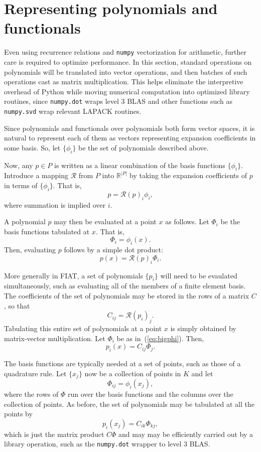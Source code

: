 \section{Representing polynomials and functionals}
Even using recurrence relations and \texttt{numpy} vectorization for
arithmetic, further care is required to optimize performance.  In this
section, standard
operations on polynomials will be translated into vector operations, and
then batches of such operations cast as matrix multiplication.  This
helps eliminate the interpretive overhead of Python while moving
numerical computation into  optimized library routines, since
\texttt{numpy.dot} wraps level 3 BLAS and other functions such as
\texttt{numpy.svd} wrap relevant LAPACK routines.

Since polynomials and
functionals over polynomials both form vector spaces, it is natural
to represent each of them as vectors representing expansion
coefficients in some basis.  So, let \( \{ \phi_i \} \) be the set of
polynomials described above.

Now, any \( p \in P \) is written as a linear combination of the basis
functions \( \{ \phi_i \} \).  Introduce a mapping \( \mathcal{R} \)
from \( P \) into \( \mathbb{R}^{|P|} \) by taking the expansion
coefficients of \( p \) in terms of \( \{ \phi_i \} \).  That is,
\[
p = \mathcal{R}(p)_i \phi_i,
\]
where summation is implied over \( i \).

A polynomial \( p \) may then be evaluated at a point \( x \) as
follows.  Let \( \Phi_i \) be the basis functions tabulated at \( x
\).  That is,
\begin{equation}
\label{eq:bigphi}
\Phi_i = \phi_i(x).
\end{equation}
Then, evaluating \( p \) follows by a simple dot product:
\begin{equation}
\label{eq:doteval}
p(x) = \mathcal{R}(p)_i \Phi_i.
\end{equation}

More generally in FIAT, a set of polynomials \( \{ p_i \} \) will need
to be evaulated simultaneously, such as evaluating all of the members
of a finite element basis.
The coefficients of the set of
polynomials may be stored in the rows of a matrix \( C \), so
that
\[
C_{ij} = \mathcal{R}(p_i)_j.
\]
Tabulating this entire set of polynomials at a point \( x \) is simply
obtained by matrix-vector multiplication.  Let \( \Phi_i \) be as
in~(\ref{eq:bigphi}).  Then,
\[
p_i(x) = C_{ij} \Phi_j.
\]

The basis functions are typically needed at a set of points, such as
those of a quadrature rule.  Let \( \{
x_j \} \) now be a collection of points in \( K \) and let
\[
\Phi_{ij} = \phi_i(x_j),
\]
where the rows of \( \Phi \) run over the basis functions and the
columns over the collection of points.  As before, the set of
polynomials may be tabulated at all the points by
\[
p_i(x_j) = C_{ik} \Phi_{kj},
\]
which is just the matrix product \( C \Phi \) and may
may be efficiently carried out by a library operation,
such as the \texttt{numpy.dot} wrapper to level 3 BLAS.

